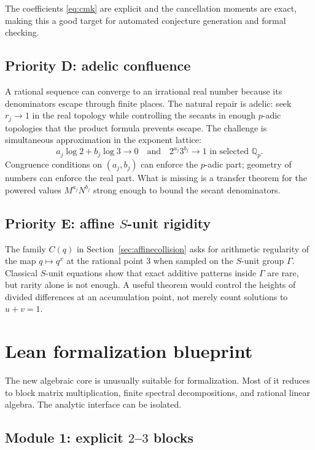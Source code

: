 \documentclass[11pt,oneside]{article}
\theoremstyle{definition}
\theoremstyle{remark}
\newcommand{\Q}{\mathbb Q}
\begin{document}
The coefficients \eqref{eq:cmk} are explicit and the cancellation moments are exact, making
this a good target for automated conjecture generation and formal checking.

\subsection{Priority D: adelic confluence}

A rational sequence can converge to an irrational real number because its denominators escape
through finite places.  The natural repair is adelic: seek $r_j\to1$ in the real topology while
controlling the secants in enough $p$-adic topologies that the product formula prevents escape.
The challenge is simultaneous approximation in the exponent lattice:
\begin{equation}
 a_j\log2+b_j\log3\to0
 \quad\text{and}\quad
 2^{a_j}3^{b_j}\to1\text{ in selected }\Q_p.
 \label{eq:adelicapprox}
\end{equation}
Congruence conditions on $(a_j,b_j)$ can enforce the $p$-adic part; geometry of numbers can
enforce the real part.  What is missing is a transfer theorem for the powered values
$M^{a_j}N^{b_j}$ strong enough to bound the secant denominators.

\subsection{Priority E: affine \texorpdfstring{$S$}{S}-unit rigidity}

The family $C(q)$ in Section~\ref{sec:affinecollision} asks for arithmetic regularity of the
map $q\mapsto q^x$ at the rational point $3$ when sampled on the $S$-unit group
$\Gamma$.  Classical $S$-unit equations show that exact additive patterns inside $\Gamma$ are
rare, but rarity alone is not enough.  A useful theorem would control the heights of divided
differences at an accumulation point, not merely count solutions to $u+v=1$.

\section{Lean formalization blueprint}
\label{sec:lean}

The new algebraic core is unusually suitable for formalization.  Most of it reduces to block
matrix multiplication, finite spectral decompositions, and rational linear algebra.  The
analytic interface can be isolated.

\subsection{Module 1: explicit \texorpdfstring{$2$--$3$}{2--3} blocks}
\end{document}
